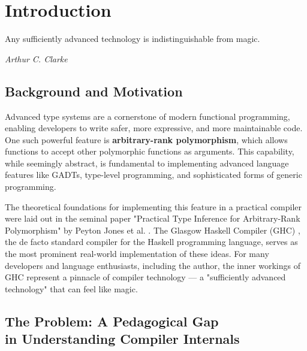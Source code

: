 \chapter{Introduction}
\label{chap:Introduction}

\epigraph{Any sufficiently advanced technology is indistinguishable from magic.}{\textit{Arthur C. Clarke}}

\section{Background and Motivation}

Advanced type systems are a cornerstone of modern functional programming, enabling developers to write safer, more expressive, and more maintainable code. One such powerful feature is \textbf{arbitrary-rank polymorphism}, which allows functions to accept other polymorphic functions as arguments. This capability, while seemingly abstract, is fundamental to implementing advanced language features like GADTs, type-level programming, and sophisticated forms of generic programming.

The theoretical foundations for implementing this feature in a practical compiler were laid out in the seminal paper "Practical Type Inference for Arbitrary-Rank Polymorphism" by Peyton Jones et al. \cite{jones-practical-2007}. The Glasgow Haskell Compiler (GHC) \cite{ghc-site-2025}, the de facto standard compiler for the Haskell programming language, serves as the most prominent real-world implementation of these ideas. For many developers and language enthusiasts, including the author, the inner workings of GHC represent a pinnacle of compiler technology --- a "sufficiently advanced technology" that can feel like magic.

\section{The Problem: A Pedagogical Gap \\ in Understanding Compiler Internals}

